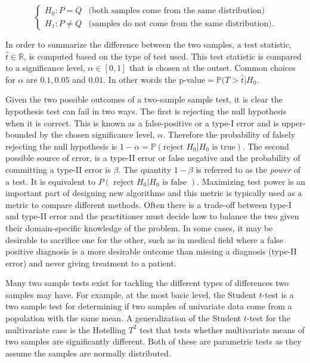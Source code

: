 \begin{equation}
  \begin{cases}
    H_0: P = Q & \text{(both samples come from the same distribution)} \\
    H_1: P \neq Q & \text{(samples do not come from the same distribution)}. 
  \end{cases}
\end{equation}

In order to summarize the difference between the two samples, a test statistic, $\hat{t} \in \mathbb{R}$, is computed based on the type of test used. This test statistic is compared to a significance level, $\alpha \in [0,1]$ that is chosen  at the outset. Common choices for $\alpha$ are $0.1, 0.05$ and $0.01$. In other words the p-value$=\mathbb{P}(T>\hat{t}|H_0$.

Given the two possible outcomes of a two-sample sample test, it is clear the hypothesis test can fail in two ways. The first is rejecting the null hypothesis when it is correct. This is known as a false-positive or a type-I error and is upper-bounded by the chosen significance level, $ \alpha$.  Therefore the probability of falsely rejecting the null hypothesis is $ 1 - \alpha = \mathbb{P}(\text{reject } H_0 | H_0 \text{ is true})$. The second possible source of error, is  a type-II error or false negative and the probability of committing a type-II error is $\beta$. The quantity $1-\beta$ is referred to as the \textit{power} of a test. It is equivalent to \(P\left(\text { reject } H_{0} | H_{0} \text { is false }\right)\). Maximizing test power is an important part of designing new algorithms and this metric is typically used as a metric to compare different methods. Often there is a trade-off  between type-I and type-II error and the practitioner must decide how to balance the two given their domain-specific knowledge of the problem. In some cases, it may be desirable to sacrifice one for the other, such as in medical field where a false positive diagnosis is a more desirable outcome than missing a diagnosis (type-II error) and never giving treatment to a patient. 

Many two sample tests exist for tackling the different types of differences two samples may have. For example, at the most basic level, the Student $t$-test is a two sample test for determining if two samples of univariate data come from a population with the same mean. A generalization of the Student $t$-test for the multivariate case is the Hotelling $T^2$ test that tests whether multivariate means of two samples are significantly different. Both of these are parametric tests as they assume the samples are normally distributed. 

